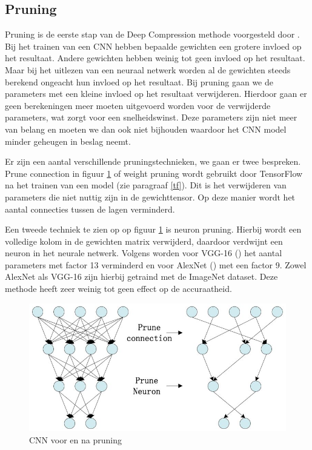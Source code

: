 \subsection{Pruning}
Pruning is de eerste stap van de Deep Compression methode voorgesteld door \cite{han_deep_2016}.
Bij het trainen van een CNN hebben bepaalde gewichten een grotere invloed op het resultaat.
Andere gewichten hebben weinig tot geen invloed op het resultaat.
Maar bij het uitlezen van een neuraal netwerk worden al de gewichten steeds berekend ongeacht hun invloed op het resultaat.
Bij pruning gaan we de parameters met een kleine invloed op het resultaat verwijderen.
Hierdoor gaan er geen berekeningen meer moeten uitgevoerd worden voor de verwijderde parameters, wat zorgt voor een snelheidswinst.
Deze parameters zijn niet meer van belang en moeten we dan ook niet bijhouden waardoor het CNN model minder geheugen in beslag neemt.

Er zijn een aantal verschillende pruningstechnieken, we gaan er twee bespreken.
Prune connection in figuur \ref{fig:pruning} of weight pruning wordt gebruikt door TensorFlow na het trainen van een model (zie paragraaf \ref{tf}).
Dit is het verwijderen van parameters die niet nuttig zijn in de gewichttensor.
Op deze manier wordt het aantal connecties tussen de lagen verminderd.

Een tweede techniek te zien op op figuur \ref{fig:pruning} is neuron pruning.
Hierbij wordt een volledige kolom in de gewichten matrix verwijderd, daardoor verdwijnt een neuron in het neurale netwerk. 
Volgens \cite{han_deep_2016} worden voor VGG-16 (\cite{simonyan2015deep}) het aantal parameters met factor 13 verminderd en voor AlexNet (\cite{Krizhevsky_act_2017}) met een factor 9.
Zowel AlexNet als VGG-16 zijn hierbij getraind met de ImageNet dataset.
Deze methode heeft zeer weinig tot geen effect op de accuraatheid.

\begin{figure}[!ht]
	\centering
	\includegraphics[width=0.65\linewidth]{fig/pruning.jpg}
	\caption{CNN voor en na pruning}
	\label{fig:pruning}
\end{figure}

